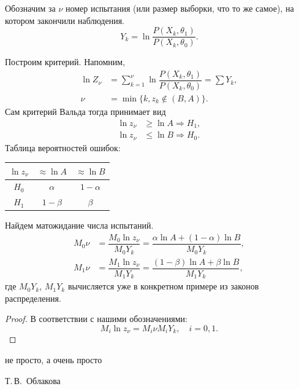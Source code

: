 Обозначим за $\nu$ номер испытания (или размер выборки, что то же самое),
на котором закончили наблюдения.
\[
  Y_k = \ln \dfrac{P(X_k, \theta_1)}{P(X_k, \theta_0)}.
\]

Построим критерий. Напомним,
\begin{align*}
  \ln Z_\nu &= \sum_{k=1}^\nu \ln \dfrac{P(X_k, \theta_1)}{P(X_k, \theta_0)} = \sum Y_k,\\
  \nu &= \min \{ k, z_k \notin (B, A)\}.
\end{align*}
Сам критерий Вальда тогда принимает вид
\begin{align*}
  \ln z_\nu &\geqslant \ln A \Rightarrow H_1, \\
  \ln z_\nu &\leqslant \ln B \Rightarrow H_0.
\end{align*}
Таблица вероятностей ошибок:
\begin{center}
\begin{tabular}{|c|c|c|}
  \hline
  $\ln z_\nu$ & $\approx \ln A$ & $\approx \ln B$ \\
  \hline
  $H_0$ & $\alpha$ & $1 - \alpha$ \\
  \hline
  $H_1$ & $1 - \beta$ & $\beta$ \\
  \hline
\end{tabular}
\end{center}

Найдем матожидание числа испытаний.
\begin{align*}
  M_0 \nu &= \dfrac{M_0 \ln z_\nu}{M_0 Y_k} = \dfrac{\alpha \ln A + (1-\alpha)
  \ln B}{M_0 Y_k}, \\
  M_1 \nu &= \dfrac{M_1 \ln z_\nu}{M_1 Y_k} = \dfrac{(1-\beta) \ln A + \beta \ln
  B}{M_1 Y_k},
\end{align*}
где $M_0 Y_k$, $M_1 Y_k$ вычисляется уже в конкретном примере из законов распределения.

\begin{proof}
  В соответствии с нашими обозначениями:
  \[
    M_i \ln z_\nu = M_i \nu M_i Y_k, \quad i = 0,
    1.
  \]
\end{proof}
  \epigraph{не просто, а очень просто}{Т.\,В.~Облакова}
